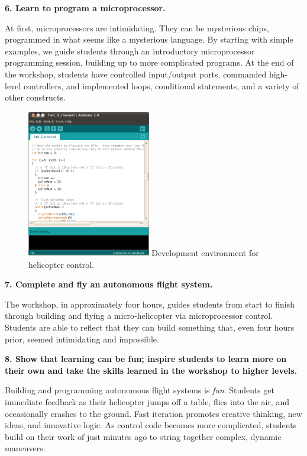 \documentclass[11pt]{article}
\begin{document}
\textbf{6. Learn to program a microprocessor.}

At first, microprocessors are intimidating.  They can be mysterious chips, programmed in what seems like a mysterious language.  By starting with simple examples, we guide students through an introductory microprocessor programming session, building up to more complicated programs.  At the end of the workshop, students have controlled input/output ports, commanded high-level controllers, and implemented loops, conditional statements, and a variety of other constructs. 

\begin{figure}
    \begin{center}
    \includegraphics[width=0.48\textwidth]{figures/program.png}
    {\small Development environment for helicopter control.}
    \end{center}
    \vspace{-20pt}
\end{figure}

\textbf{7. Complete and fly an autonomous flight system.}

The workshop, in approximately four hours, guides students from start to finish through building and flying a micro-helicopter via microprocessor control.  Students are able to reflect that they can build something that, even four hours prior, seemed intimidating and impossible.

\textbf{8. Show that learning can be fun; inspire students to learn more on their own and take the skills learned in the workshop to higher levels.}

Building and programming autonomous flight systems is \textit{fun}.  Students get immediate feedback as their helicopter jumps off a table, flies into the air, and occasionally crashes to the ground.  Fast iteration promotes creative thinking, new ideas, and innovative logic.  As control code becomes more complicated, students build on their work of just minutes ago to string together complex, dynamic maneuvers.
\end{document}
